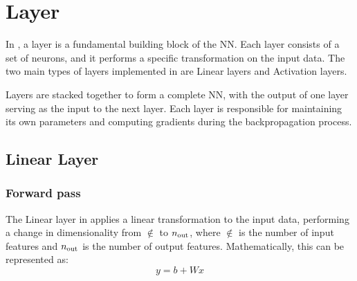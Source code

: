 \section{Layer}

In \mfnet, a layer is a fundamental building block of the \acl{NN}. Each layer consists of a set of neurons, and it performs a specific transformation on the input data. The two main types of layers implemented in \mfnet are Linear layers and Activation layers.


Layers are stacked together to form a complete \acl{NN}, with the output of one layer serving as the input to the next layer.  Each layer is responsible for maintaining its own parameters and computing gradients during the backpropagation process.


\subsection{Linear Layer}
\subsubsection{Forward pass}
The Linear layer in \mfnet applies a linear transformation to the input data, performing a change in dimensionality from $\nin$ to $n_\text{out}$, where $\nin$ is the number of input features and $n_\text{out}$ is the number of output features. Mathematically, this can be represented as:
\begin{equation}
    y = b + Wx
\end{equation}

